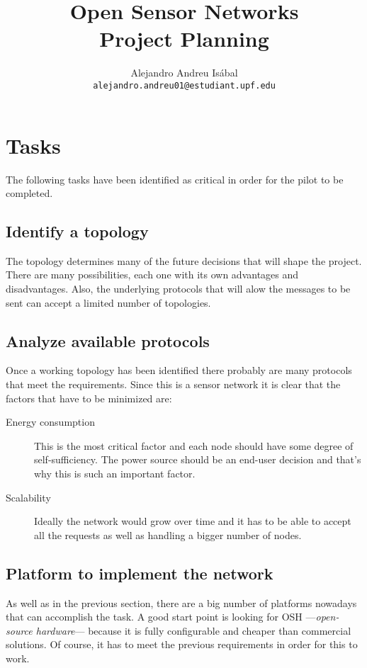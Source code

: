 \documentclass[a4paper,english]{article}
\title{
    Open Sensor Networks\\
    Project Planning
}
\author{
    Alejandro Andreu Isábal\\
    \texttt{alejandro.andreu01@estudiant.upf.edu}
}
\begin{document}
    \maketitle

    \section{Tasks}

        The following tasks have been identified as critical in order for the pilot to be completed.

        \subsection{Identify a topology}

            The topology determines many of the future decisions that will shape the project. There are many possibilities, each one with its own advantages and disadvantages. Also, the underlying protocols that will alow the messages to be sent can accept a limited number of topologies.

            
        \subsection{Analyze available protocols}

            Once a working topology has been identified there probably are many protocols that meet the requirements. Since this is a sensor network it is clear that the factors that have to be minimized are:

            \begin{description}
                \item[Energy consumption] This is the most critical factor and each node should have some degree of self-sufficiency. The power source should be an end-user decision and that's why this is such an important factor.
                \item[Scalability] Ideally the network would grow over time and it has to be able to accept all the requests as well as handling a bigger number of nodes.
            \end{description}


        \subsection{Platform to implement the network}
            
            As well as in the previous section, there are a big number of platforms nowadays that can accomplish the task. A good start point is looking for OSH ---\emph{open-source hardware}--- because it is fully configurable and cheaper than commercial solutions. Of course, it has to meet the previous requirements in order for this to work.
\end{document}
